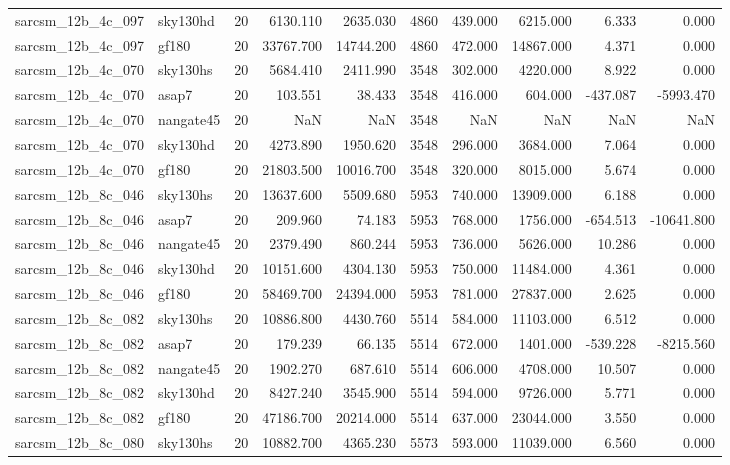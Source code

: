 \begin{tabular}{llrrrrrrrr}
sarcsm\_12b\_4c\_097 & sky130hd & 20 & 6130.110 & 2635.030 & 4860 & 439.000 & 6215.000 & 6.333 & 0.000 \\
sarcsm\_12b\_4c\_097 & gf180 & 20 & 33767.700 & 14744.200 & 4860 & 472.000 & 14867.000 & 4.371 & 0.000 \\
sarcsm\_12b\_4c\_070 & sky130hs & 20 & 5684.410 & 2411.990 & 3548 & 302.000 & 4220.000 & 8.922 & 0.000 \\
sarcsm\_12b\_4c\_070 & asap7 & 20 & 103.551 & 38.433 & 3548 & 416.000 & 604.000 & -437.087 & -5993.470 \\
sarcsm\_12b\_4c\_070 & nangate45 & 20 & NaN & NaN & 3548 & NaN & NaN & NaN & NaN \\
sarcsm\_12b\_4c\_070 & sky130hd & 20 & 4273.890 & 1950.620 & 3548 & 296.000 & 3684.000 & 7.064 & 0.000 \\
sarcsm\_12b\_4c\_070 & gf180 & 20 & 21803.500 & 10016.700 & 3548 & 320.000 & 8015.000 & 5.674 & 0.000 \\
sarcsm\_12b\_8c\_046 & sky130hs & 20 & 13637.600 & 5509.680 & 5953 & 740.000 & 13909.000 & 6.188 & 0.000 \\
sarcsm\_12b\_8c\_046 & asap7 & 20 & 209.960 & 74.183 & 5953 & 768.000 & 1756.000 & -654.513 & -10641.800 \\
sarcsm\_12b\_8c\_046 & nangate45 & 20 & 2379.490 & 860.244 & 5953 & 736.000 & 5626.000 & 10.286 & 0.000 \\
sarcsm\_12b\_8c\_046 & sky130hd & 20 & 10151.600 & 4304.130 & 5953 & 750.000 & 11484.000 & 4.361 & 0.000 \\
sarcsm\_12b\_8c\_046 & gf180 & 20 & 58469.700 & 24394.000 & 5953 & 781.000 & 27837.000 & 2.625 & 0.000 \\
sarcsm\_12b\_8c\_082 & sky130hs & 20 & 10886.800 & 4430.760 & 5514 & 584.000 & 11103.000 & 6.512 & 0.000 \\
sarcsm\_12b\_8c\_082 & asap7 & 20 & 179.239 & 66.135 & 5514 & 672.000 & 1401.000 & -539.228 & -8215.560 \\
sarcsm\_12b\_8c\_082 & nangate45 & 20 & 1902.270 & 687.610 & 5514 & 606.000 & 4708.000 & 10.507 & 0.000 \\
sarcsm\_12b\_8c\_082 & sky130hd & 20 & 8427.240 & 3545.900 & 5514 & 594.000 & 9726.000 & 5.771 & 0.000 \\
sarcsm\_12b\_8c\_082 & gf180 & 20 & 47186.700 & 20214.000 & 5514 & 637.000 & 23044.000 & 3.550 & 0.000 \\
sarcsm\_12b\_8c\_080 & sky130hs & 20 & 10882.700 & 4365.230 & 5573 & 593.000 & 11039.000 & 6.560 & 0.000 \\

\end{tabular}
